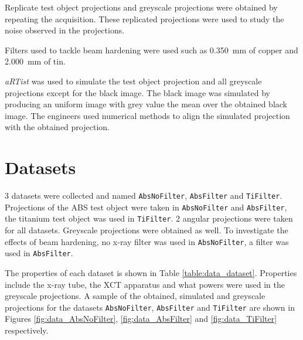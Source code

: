 Replicate test object projections and greyscale projections were obtained by repeating the acquisition. These replicated projections were used to study the noise observed in the projections.

Filters used to tackle beam hardening were used such as \SI{0.350}{\milli\metre} of copper and \SI{2.000}{\milli\metre} of tin.

\emph{aRTist} was used to simulate the test object projection and all greyscale projections except for the black image. The black image was simulated by producing an uniform image with grey value the mean over the obtained black image. The engineers used numerical methods to align the simulated projection with the obtained projection.

\section{Datasets}

3 datasets were collected and named \texttt{AbsNoFilter}, \texttt{AbsFilter} and \texttt{TiFilter}. Projections of the ABS test object were taken in \texttt{AbsNoFilter} and \texttt{AbsFilter}, the titanium test object was used in \texttt{TiFilter}. 2 angular projections were taken for all datasets. Greyscale projections were obtained as well. To investigate the effects of beam hardening, no x-ray filter was used in \texttt{AbsNoFilter}, a filter was used in \texttt{AbsFilter}.

The properties of each dataset is shown in Table \ref{table:data_dataset}. Properties include the x-ray tube, the XCT apparatus and what powers were used in the greyscale projections. A sample of the obtained, simulated and greyscale projections for the datasets \texttt{AbsNoFilter}, \texttt{AbsFilter} and \texttt{TiFilter} are shown in Figures \ref{fig:data_AbsNoFilter}, \ref{fig:data_AbsFilter} and \ref{fig:data_TiFilter} respectively.

